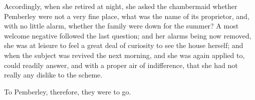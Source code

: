Accordingly, when she retired at night, she asked the chambermaid whether Pemberley were not a very fine place, what was the name of its proprietor, and, with no little alarm, whether the family were down for the summer? A most welcome negative followed the last question; and her alarms being now removed, she was at leisure to feel a great deal of curiosity to see the house herself; and when the subject was revived the next morning, and she was again applied to, could readily answer, and with a proper air of indifference, that she had not really any dislike to the scheme.

To Pemberley, therefore, they were to go.


 \makeatletter
{}
{%
	


}{%
	\enlargethispage{\baselineskip} 
	
}
\makeatother